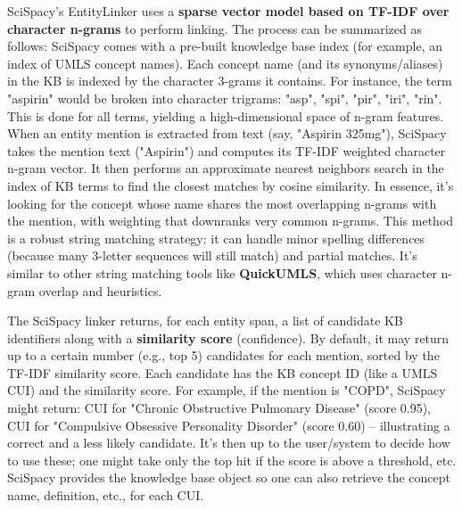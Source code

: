 SciSpacy's EntityLinker uses a \textbf{sparse vector model based on TF-IDF over character n-grams} to perform linking. The process can be summarized as follows: SciSpacy comes with a pre-built knowledge base index (for example, an index of UMLS concept names). Each concept name (and its synonyms/aliases) in the KB is indexed by the character 3-grams it contains. For instance, the term "aspirin" would be broken into character trigrams: "asp", "spi", "pir", "iri", "rin". This is done for all terms, yielding a high-dimensional space of n-gram features. When an entity mention is extracted from text (say, "Aspirin 325mg"), SciSpacy takes the mention text ("Aspirin") and computes its TF-IDF weighted character n-gram vector. It then performs an approximate nearest neighbors search in the index of KB terms to find the closest matches by cosine similarity. In essence, it's looking for the concept whose name shares the most overlapping n-grams with the mention, with weighting that downranks very common n-grams. This method is a robust string matching strategy: it can handle minor spelling differences (because many 3-letter sequences will still match) and partial matches. It's similar to other string matching tools like \textbf{QuickUMLS}, which uses character n-gram overlap and heuristics.

The SciSpacy linker returns, for each entity span, a list of candidate KB identifiers along with a \textbf{similarity score} (confidence). By default, it may return up to a certain number (e.g., top 5) candidates for each mention, sorted by the TF-IDF similarity score. Each candidate has the KB concept ID (like a UMLS CUI) and the similarity score. For example, if the mention is "COPD", SciSpacy might return: CUI for "Chronic Obstructive Pulmonary Disease" (score 0.95), CUI for "Compulsive Obsessive Personality Disorder" (score 0.60) – illustrating a correct and a less likely candidate. It's then up to the user/system to decide how to use these; one might take only the top hit if the score is above a threshold, etc. SciSpacy provides the knowledge base object so one can also retrieve the concept name, definition, etc., for each CUI.

